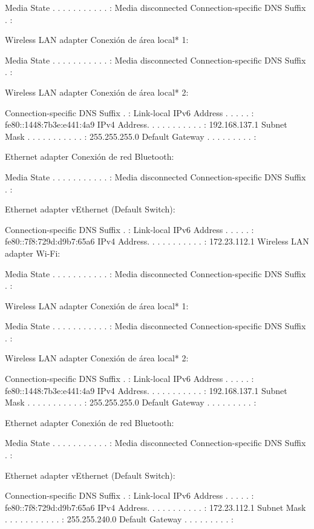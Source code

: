 \documentclass[CAT]{PECTeX}
\begin{document}
{	Media State . . . . . . . . . . . : Media disconnected
	Connection-specific DNS Suffix  . :
	
	Wireless LAN adapter Conexión de área local* 1:
	
	Media State . . . . . . . . . . . : Media disconnected
	Connection-specific DNS Suffix  . :
	
	Wireless LAN adapter Conexión de área local* 2:
	
	Connection-specific DNS Suffix  . :
	Link-local IPv6 Address . . . . . : fe80::1448:7b3e:e441:4a9%
	IPv4 Address. . . . . . . . . . . : 192.168.137.1
	Subnet Mask . . . . . . . . . . . : 255.255.255.0
	Default Gateway . . . . . . . . . :
	
	Ethernet adapter Conexión de red Bluetooth:
	
	Media State . . . . . . . . . . . : Media disconnected
	Connection-specific DNS Suffix  . :
	
	Ethernet adapter vEthernet (Default Switch):
	
	Connection-specific DNS Suffix  . :
	Link-local IPv6 Address . . . . . : fe80::7f8:729d:d9b7:65a6%
	IPv4 Address. . . . . . . . . . . : 172.23.112.1
	Wireless LAN adapter Wi-Fi:
	
	Media State . . . . . . . . . . . : Media disconnected
	Connection-specific DNS Suffix  . :
	
	Wireless LAN adapter Conexión de área local* 1:
	
	Media State . . . . . . . . . . . : Media disconnected
	Connection-specific DNS Suffix  . :
	
	Wireless LAN adapter Conexión de área local* 2:
	
	Connection-specific DNS Suffix  . :
	Link-local IPv6 Address . . . . . : fe80::1448:7b3e:e441:4a9%
	IPv4 Address. . . . . . . . . . . : 192.168.137.1
	Subnet Mask . . . . . . . . . . . : 255.255.255.0
	Default Gateway . . . . . . . . . :
	
	Ethernet adapter Conexión de red Bluetooth:
	
	Media State . . . . . . . . . . . : Media disconnected
	Connection-specific DNS Suffix  . :
	
	Ethernet adapter vEthernet (Default Switch):
	
	Connection-specific DNS Suffix  . :
	Link-local IPv6 Address . . . . . : fe80::7f8:729d:d9b7:65a6%
	IPv4 Address. . . . . . . . . . . : 172.23.112.1
	Subnet Mask . . . . . . . . . . . : 255.255.240.0
	Default Gateway . . . . . . . . . :
}
\end{document}
